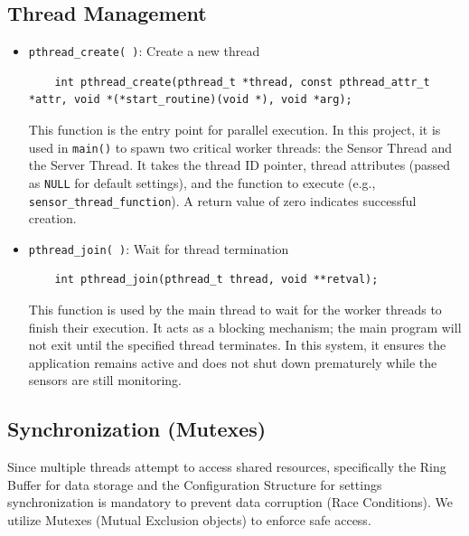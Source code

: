 \subsection{Thread Management}
\begin{itemize}
    \item \texttt{pthread\_create( )}: Create a new thread
   	\begin{verbatim}
   	int pthread_create(pthread_t *thread, const pthread_attr_t *attr, void *(*start_routine)(void *), void *arg);
   	\end{verbatim}
    This function is the entry point for parallel execution. In this project,
    it is used in \texttt{main()} to spawn two critical worker threads: the
    Sensor Thread and the Server Thread. It takes the thread ID pointer,
    thread attributes (passed as \texttt{NULL} for default settings), and the
    function to execute (e.g., \texttt{sensor\_thread\_function}). A return
    value of zero indicates successful creation.

    \item \texttt{pthread\_join( )}: Wait for thread termination
    \begin{verbatim}
    int pthread_join(pthread_t thread, void **retval);
    \end{verbatim}
    This function is used by the main thread to wait for the worker threads to
    finish their execution. It acts as a blocking mechanism; the main program
    will not exit until the specified thread terminates. In this system, it
    ensures the application remains active and does not shut down prematurely
    while the sensors are still monitoring.
\end{itemize}

\subsection{Synchronization (Mutexes)}
Since multiple threads attempt to access shared resources, specifically the Ring Buffer for data storage and the Configuration Structure for settings synchronization is mandatory to prevent data corruption (Race Conditions). We utilize Mutexes (Mutual Exclusion objects) to enforce safe access.

